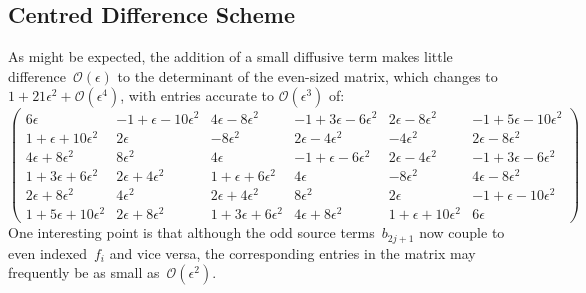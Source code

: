 \subsection{Centred Difference Scheme}\label{sec:centred}
As might be expected, the addition of a small diffusive term makes little difference~$\mathcal{O}(\epsilon)$
to  the determinant of the even-sized matrix, which changes to $1+21 \epsilon^2+ \mathcal{O}(\epsilon^4)$,
with entries accurate to $\mathcal{O}(\epsilon^3)$ of:
\begin{equation}\begin{pmatrix}
6 \epsilon & -1+\epsilon-10 \epsilon^2 & 4 \epsilon-8 \epsilon^2 & -1+3 \epsilon-6 \epsilon^2 & 2 \epsilon-8 \epsilon^2 & -1+5 \epsilon-10 \epsilon^2  \\
1+\epsilon+10 \epsilon^2 & 2 \epsilon & -8 \epsilon^2 & 2 \epsilon-4 \epsilon^2 & -4 \epsilon^2 & 2 \epsilon-8 \epsilon^2  \\
4 \epsilon+8 \epsilon^2 & 8 \epsilon^2 & 4 \epsilon & -1+\epsilon-6 \epsilon^2 & 2 \epsilon-4 \epsilon^2 & -1+3 \epsilon-6 \epsilon^2  \\
1+3 \epsilon+6 \epsilon^2 & 2 \epsilon+4 \epsilon^2 & 1+\epsilon+6 \epsilon^2 & 4 \epsilon & -8 \epsilon^2 & 4 \epsilon-8 \epsilon^2  \\
2 \epsilon+8 \epsilon^2 & 4 \epsilon^2 & 2 \epsilon+4 \epsilon^2 & 8 \epsilon^2 & 2 \epsilon & -1+\epsilon-10 \epsilon^2  \\
1+5 \epsilon+10 \epsilon^2 & 2 \epsilon+8 \epsilon^2 & 1+3 \epsilon+6 \epsilon^2 & 4 \epsilon+8 \epsilon^2 & 1+\epsilon+10 \epsilon^2 & 6 \epsilon 
\end{pmatrix} \end{equation}
One interesting point is that although the odd source
terms~$b_{2j+1}$ now couple to even indexed~$f_i$ and vice versa, the corresponding entries in the matrix
may frequently be as small as~$\mathcal{O}(\epsilon^2)$.

